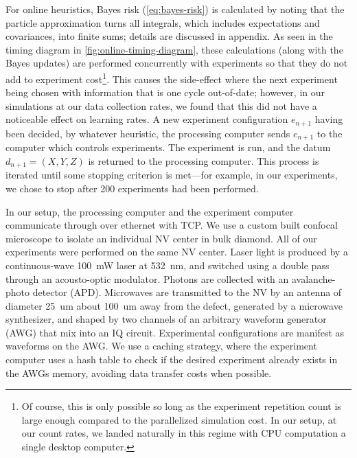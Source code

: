 \documentclass[aps,nofootinbib,twocolumn,superscriptaddress]{revtex4}
\newcommand{\eps}{e}
\newcommand{\data}{d}
\begin{document}
For online heuristics, Bayes risk (\autoref{eq:bayes-risk}) 
is calculated by noting that the 
particle approximation turns all integrals, which includes
expectations and covariances, into finite sums;
details are discussed in appendix\TODO.
As seen in the timing diagram in \autoref{fig:online-timing-diagram}, these 
calculations (along with the Bayes updates) are
performed concurrently with experiments so that they do not 
add to experiment cost\footnote{Of course, this is only
possible so long as the experiment repetition count is large 
enough compared to the parallelized simulation cost. In our setup, at
our count rates, we landed naturally in this regime with
CPU computation a single desktop computer.}.
This causes the side-effect where the next experiment being chosen with
information that is one cycle out-of-date; however,
in our simulations at our data collection rates,
we found that this did not have a noticeable
effect on learning rates.
A new experiment configuration $\eps_{n+1}$ having been 
decided, by whatever heuristic, 
the processing computer sends $\eps_{n+1}$ to the 
computer which controls experiments.
The experiment is run, and the datum $\data_{n+1}=(X,Y,Z)$
is returned to the processing computer.
This process is iterated until some stopping criterion is met---for
example, in our experiments, we chose to 
stop after 200 experiments had been performed.

In our setup, the processing computer and the experiment
computer communicate through over ethernet with TCP.
We use a custom built confocal microscope to isolate an individual
NV center in bulk diamond.
All of our experiments were performed on the same NV center.
Laser light is produced by a continuous-wave \SI{100}{mW} laser
at \SI{532}{nm}, and switched using a double pass through an
acousto-optic modulator. %
Photons are collected with an avalanche-photo detector
(APD).%
Microwaves are transmitted to the NV by an antenna of 
diameter \SI{25}{um} about \SI{100}{um} away from the defect,
generated by a microwave synthesizer, and shaped by two channels of
an arbitrary waveform generator (AWG)%
that mix into an IQ circuit. %
Experimental configurations are manifest as waveforms on the AWG.
We use a caching strategy, where the experiment computer
uses a hash table to check if the desired experiment already 
exists in the AWGs memory, avoiding data transfer costs when possible.
\end{document}
